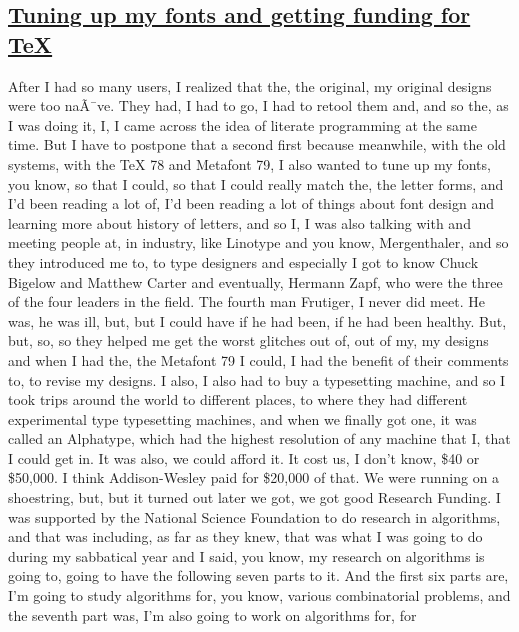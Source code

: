 \documentclass[]{article}
\begin{document}
\subsection{\texorpdfstring{\href{http://webofstories.com/play/17123}{Tuning
up my fonts and getting funding for
TeX}}{Tuning up my fonts and getting funding for TeX}}\label{tuning-up-my-fonts-and-getting-funding-for-tex}

After I had so many users, I realized that the, the original, my
original designs were too naÃ¯ve. They had, I had to go, I had to retool
them and, and so the, as I was doing it, I, I came across the idea of
literate programming at the same time. But I have to postpone that a
second first because meanwhile, with the old systems, with the TeX 78
and Metafont 79, I also wanted to tune up my fonts, you know, so that I
could, so that I could really match the, the letter forms, and I'd been
reading a lot of, I'd been reading a lot of things about font design and
learning more about history of letters, and so I, I was also talking
with and meeting people at, in industry, like Linotype and you know,
Mergenthaler, and so they introduced me to, to type designers and
especially I got to know Chuck Bigelow and Matthew Carter and
eventually, Hermann Zapf, who were the three of the four leaders in the
field. The fourth man Frutiger, I never did meet. He was, he was ill,
but, but I could have if he had been, if he had been healthy. But, but,
so, so they helped me get the worst glitches out of, out of my, my
designs and when I had the, the Metafont 79 I could, I had the benefit
of their comments to, to revise my designs. I also, I also had to buy a
typesetting machine, and so I took trips around the world to different
places, to where they had different experimental type typesetting
machines, and when we finally got one, it was called an Alphatype, which
had the highest resolution of any machine that I, that I could get in.
It was also, we could afford it. It cost us, I don't know, \$40 or
\$50,000. I think Addison-Wesley paid for \$20,000 of that. We were
running on a shoestring, but, but it turned out later we got, we got
good Research Funding. I was supported by the National Science
Foundation to do research in algorithms, and that was including, as far
as they knew, that was what I was going to do during my sabbatical year
and I said, you know, my research on algorithms is going to, going to
have the following seven parts to it. And the first six parts are, I'm
going to study algorithms for, you know, various combinatorial problems,
and the seventh part was, I'm also going to work on algorithms for, for
\end{document}
